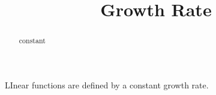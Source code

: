 \documentclass{ximera}
\title{Growth Rate}
\begin{document}
\begin{abstract}
constant
\end{abstract}
\maketitle



LInear functions are defined by a constant growth rate.
\end{document}
